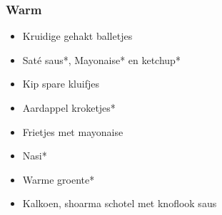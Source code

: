 \subsubsection{Warm}
\begin{itemize}
	\item	Kruidige gehakt balletjes
	\item	Saté saus*, Mayonaise* en ketchup*
	\item	Kip spare kluifjes
	\item	Aardappel kroketjes*
	\item	Frietjes met mayonaise
	\item	Nasi*
	\item	Warme groente*
	\item	Kalkoen, shoarma schotel met knoflook saus
\end{itemize}
